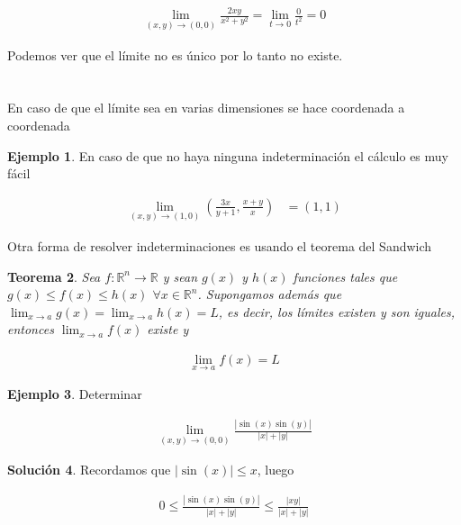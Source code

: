 \documentclass{article}
\theoremstyle{plain}
\newtheorem{thm}{Teorema}[section]
\theoremstyle{definition}
\newtheorem{ejem}[thm]{Ejemplo}
\newtheorem{sol}[thm]{Solución}
\begin{document}
\begin{align*}
\displaystyle \lim_{(x,y) \to (0,0)}  \frac{2xy}{x^2+y^2}  = \lim_{t \to 0}  \frac{0}{t^2}   = 0
\end{align*}

Podemos ver que el l\'imite no es \'unico por lo tanto no existe. \\ \\ \\


En caso de que el l\'imite sea en varias dimensiones se hace coordenada a coordenada \\




\begin{ejem}En caso de que no haya ninguna indeterminación el cálculo es muy fácil \\
\end{ejem}


\begin{align*}
\displaystyle \lim_{(x,y) \to (1,0)}   \left( \frac{ 3x}{y+1} , \frac{x+y}{x}\right)    &=  \left( 1 , 1\right)
\end{align*}

Otra forma de resolver indeterminaciones es usando el teorema del Sandwich \\

\begin{thm}Sea $f: \mathbb{R}^n \to \mathbb{R}$ y sean $g(x)$ y $h(x)$ funciones tales que $g(x) \leq f(x) \leq h(x)$ $\forall x \in \mathbb{R}^n$. Supongamos adem\'as que $\displaystyle \lim_{x \to a} g(x) = \lim_{x \to a} h(x) = L$, es decir, los l\'imites existen y son iguales, entonces $\displaystyle\lim_{x \to a} f(x)$ existe y
\end{thm}

\begin{align*}
    \lim_{x \to a} f(x) = L
\end{align*}

\begin{ejem}Determinar
\end{ejem}

\begin{align*}
    \lim_{(x,y) \to (0,0)} \frac{|\sin(x)\sin(y)|}{|x|+|y|}
\end{align*}

\begin{sol}Recordamos que $|\sin(x)| \leq x$, luego
\end{sol}


\begin{align*}
    0 \leq \frac{|\sin(x)\sin(y)|}{|x|+|y|} \leq \frac{|xy|}{|x|+|y|}
\end{align*}
\end{document}
